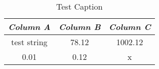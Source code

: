 \begin{table*}[h]
\centering
\caption{Test Caption}
\label{test:label}\begin{tabular}{|c|c|c|}
\hline\textit{Column A}&\textit{Column B}&\textit{Column C}\\\hline
test string&78.12&1002.12\\
\hline
0.01&0.12&x\\
\hline
\end{tabular}
\end{table*}